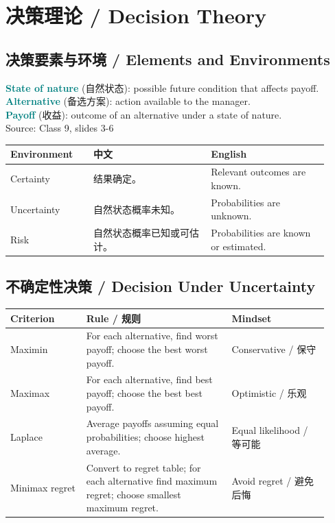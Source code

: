 \documentclass[10pt,a4paper]{ctexart}
\newcommand{\term}[2]{\textbf{\textcolor{Teal}{#1}} \textcolor{Muted}{(#2)}}
\newcommand{\source}[1]{\textcolor{Muted}{\footnotesize Source: #1}}
\begin{document}
\section{决策理论 / Decision Theory}
\label{sec:decision}

\subsection{决策要素与环境 / Elements and Environments}
\term{State of nature}{自然状态}: possible future condition that affects payoff.\\
\term{Alternative}{备选方案}: action available to the manager.\\
\term{Payoff}{收益}: outcome of an alternative under a state of nature.\\
\source{Class 9, slides 3-6}

\begin{longtable}{@{}L{0.24\linewidth}L{0.34\linewidth}L{0.34\linewidth}@{}}
\toprule
\textbf{Environment} & \textbf{中文} & \textbf{English} \\
\midrule
Certainty & 结果确定。 & Relevant outcomes are known. \\
Uncertainty & 自然状态概率未知。 & Probabilities are unknown. \\
Risk & 自然状态概率已知或可估计。 & Probabilities are known or estimated. \\
\bottomrule
\end{longtable}

\subsection{不确定性决策 / Decision Under Uncertainty}
\label{subsec:uncertainty}

\begin{longtable}{@{}L{0.22\linewidth}L{0.42\linewidth}L{0.28\linewidth}@{}}
\toprule
\textbf{Criterion} & \textbf{Rule / 规则} & \textbf{Mindset} \\
\midrule
Maximin & For each alternative, find worst payoff; choose the best worst payoff. & Conservative / 保守 \\
Maximax & For each alternative, find best payoff; choose the best best payoff. & Optimistic / 乐观 \\
Laplace & Average payoffs assuming equal probabilities; choose highest average. & Equal likelihood / 等可能 \\
Minimax regret & Convert to regret table; for each alternative find maximum regret; choose smallest maximum regret. & Avoid regret / 避免后悔 \\
\bottomrule
\end{longtable}
\end{document}
